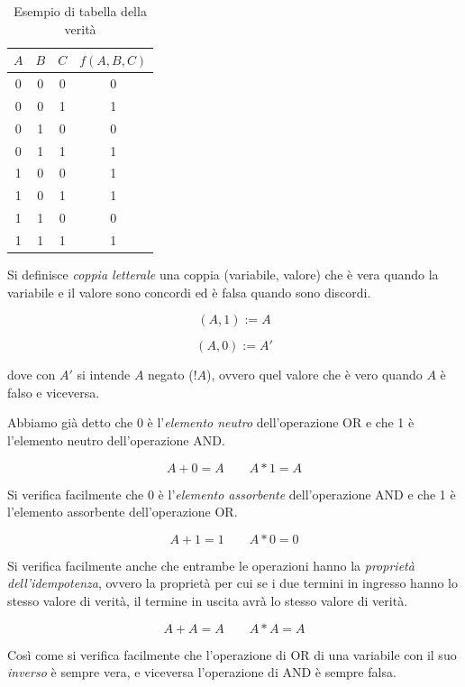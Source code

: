 \documentclass{article}
\begin{document}
\begin{table}[h]
  \centering
  \begin{tabular}{| c | c | c | c |}
  \hline
  $A$ & $B$ & $C$ & $f(A, B, C)$ \\ \hline
  0 & 0 & 0 & 0 \\ \hline
  0 & 0 & 1 & 1 \\ \hline
  0 & 1 & 0 & 0 \\ \hline
  0 & 1 & 1 & 1 \\ \hline
  1 & 0 & 0 & 1 \\ \hline
  1 & 0 & 1 & 1 \\ \hline
  1 & 1 & 0 & 0 \\ \hline
  1 & 1 & 1 & 1 \\ \hline
  \end{tabular}
  \caption{Esempio di tabella della verità}
  \label{Tabella_verita}
\end{table}

Si definisce \textit{coppia letterale} una coppia (variabile, valore) che è vera quando la variabile e il valore sono concordi ed è falsa quando sono discordi.

\[(A,1) := A\]

\[(A,0) := A'\]

dove con $A'$ si intende $A$ negato ($!A$), ovvero quel valore che è vero quando $A$ è falso e viceversa.

\vspace{3mm}

Abbiamo già detto che 0 è l'\textit{elemento neutro} dell'operazione OR e che 1 è l'elemento neutro dell'operazione AND.

\[A + 0 = A \quad \quad A * 1 = A\]

Si verifica facilmente che 0 è l'\textit{elemento assorbente} dell'operazione AND e che 1 è l'elemento assorbente dell'operazione OR.

\[A + 1 = 1 \quad \quad A * 0 = 0\]

Si verifica facilmente anche che entrambe le operazioni hanno la \textit{proprietà dell'idempotenza}, ovvero la proprietà per cui se i due termini in ingresso hanno lo stesso valore di verità, il termine in uscita avrà lo stesso valore di verità.

\[A + A = A \quad \quad A * A = A\]

Così come si verifica facilmente che l'operazione di OR di una variabile con il suo \textit{inverso} è sempre vera, e viceversa l'operazione di AND è sempre falsa.
\end{document}
